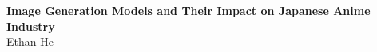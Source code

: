 \documentclass[12pt]{article}
\begin{document}
\begin{flushleft}


{\Large\bf Image Generation Models and Their Impact on Japanese Anime Industry} \\
Ethan He \\

\setlength{\parindent}{0.5in}






\newpage
\printbibliography[heading=subbibliography]

\end{flushleft}
\end{document}
